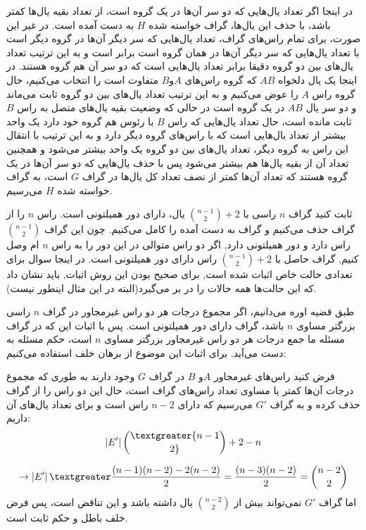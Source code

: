 \documentclass[11pt,largemargins]{h2wp}
\begin{document}
     در اینجا اگر تعداد یال‌هایی که دو سر آن‌ها در یک گروه است، از تعداد بقیه یال‌ها کمتر باشد، با حذف این یال‌ها، گراف خواسته شده $H$ به دست آمده است. در غیر این صورت، برای تمام راس‌های گراف، تعداد یال‌هایی که سر دیگر آن‌ها در گروه دیگر است با تعداد یال‌هایی که سر دیگر آن‌ها در همان گروه است برابر است و به این ترتیب تعداد یال‌های بین دو گروه دقیقا برابر تعداد یال‌هایی است که دو سر آن هم گروه‌ هستند. در اینجا یک یال دلخواه $AB$ که گروه راس‌های $A$و$B$ متفاوت است را انتخاب می‌کنیم، حال گروه راس $A$ را عوض می‌کنیم و به این ترتیب تعداد یال‌های بین دو گروه ثابت می‌ماند و دو سر یال $AB$ در یک گروه است در حالی که وضعیت بقیه یال‌های متصل به راس $B$ ثابت مانده است، حال تعداد یال‌هایی که راس $B$ با رئوس هم گروه خود دارد یک واحد بیشتر از تعداد یال‌هایی است که با راس‌های گروه دیگر دارد و به این ترتیب با انتقال این راس به گروه دیگر، تعداد یال‌های بین دو گروه یک واحد بیشتر می‌شود و همچنین تعداد آن از بقیه یال‌ها هم بیشتر می‌شود پس با حذف یال‌هایی که دو سر آن‌ها در یک گروه هستند که تعداد آن‌ها کمتر از نصف تعداد کل یال‌ها در گراف $G$ است، به گراف خواسته شده $H$ می‌رسیم.
       
 \question

    ثابت کنید گراف $n$ راسی با ${{n-1} \choose 2} + 2$ یال، دارای دور همیلتونی است. 
\solution
راس
$n$
را از گراف حذف می‌کنیم و گراف به دست آمده را کامل می‌کنیم. چون این گراف 
  ${{n-1}\choose{2}}$ 
  راس دارد و دور همیلتونی دارد, اگر دو راس متوالی در این دور را به راس
  $n$
  ام وصل کنیم, گراف حاصل با 
  ${{n-1} \choose 2} + 2$ 
راس   دارای دور همیلتونی است.
\notes
{} 
در اینجا سوال برای تعدادی حالت خاص اثبات شده است, برای صحیح بودن این روش اثبات, باید نشان داد که این حالت‌ها همه حالات را در بر می‌گیرد(البته در این مثال اینطور نیست).

     طبق قضیه اوره می‌دانیم، اگر مجموع درجات هر دو راس غیرمجاور در گراف $n$ راسی بزرگتر مساوی  $n$ باشد، گراف دارای دور همیلتونی است. پس با اثبات این‌ که در گراف مسئله ما جمع درجات هر دو راس غیرمجاور بزرگتر مساوی  $n$ است، حکم مسئله به دست می‌آید. برای اثبات این موضوع از برهان خلف استفاده می‌کنیم:


فرض کنید راس‌های غیرمجاور $A$و $B$ در گراف $G$ وجود دارند به طوری که مجموع درجات آن‌ها کمتر یا مساوی تعداد راس‌های گراف است، حال این دو راس را از گراف حذف کرده و به گراف 
$G'$
می‌رسیم که دارای
$n-2$
راس است و برای تعداد یال‌های آن داریم:
\[ \left|{E'}\right| \textgreater {n-1\choose 2} + 2 - n\]

\[\to \left|{E'}\right| \textgreater\dfrac{(n-1)(n-2)-2(n-2)}{2}=\dfrac{(n-3)(n-2)}{2}= {n-2\choose 2}\]
اما گراف 
$G'$
نمی‌تواند بیش از
${n-2\choose 2}$
یال داشته باشد و این تناقض است، پس فرض خلف باطل و حکم ثابت است.
\end{document}
